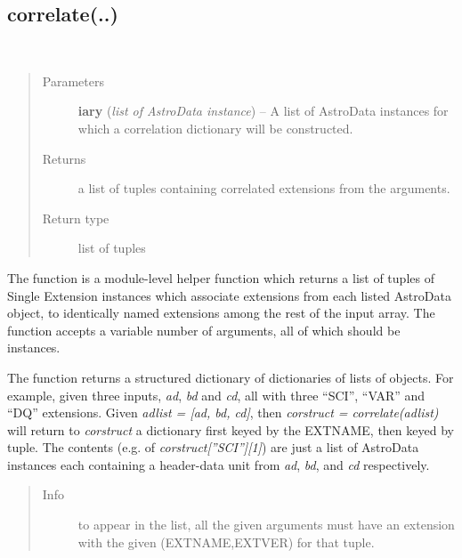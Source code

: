 \documentclass[letterpaper,10pt,english]{sphinxmanual}
\begin{document}
\subsection{correlate(..)}
\label{chapter_AstroDataClass:correlate}

\begin{fulllineitems}
\label{chapter_AstroDataClass:astrodata.data.correlate}~\begin{quote}\begin{description}
\item[{Parameters}] \leavevmode
\textbf{iary} (\emph{list of AstroData instance}) -- A list of AstroData instances for which a correlation dictionary
will be constructed.

\item[{Returns}] \leavevmode
a list of tuples containing correlated extensions from the arguments.

\item[{Return type}] \leavevmode
list of tuples

\end{description}\end{quote}

The  function is a module-level helper function which returns
a list of tuples of Single Extension  instances which associate
extensions from each listed AstroData object, to identically named
extensions among the rest of the input array. The  function
accepts a variable number of arguments, all of which should be 
instances.

The function returns a structured dictionary of dictionaries of lists of
 objects. For example, given three inputs, \emph{ad}, \emph{bd} and \emph{cd}, all
with three ``SCI'', ``VAR'' and ``DQ'' extensions. Given \emph{adlist = {[}ad, bd,
cd{]}}, then \emph{corstruct = correlate(adlist)} will return to \emph{corstruct} a
dictionary first keyed by the EXTNAME, then keyed by tuple. The contents
(e.g. of \emph{corstruct{[}''SCI''{]}{[}1{]}}) are just a list of AstroData instances each
containing a header-data unit from \emph{ad}, \emph{bd}, and \emph{cd} respectively.
\begin{quote}\begin{description}
\item[{Info }] \leavevmode
to appear in the list, all the given arguments must have an extension
with the given (EXTNAME,EXTVER) for that tuple.

\end{description}\end{quote}

\end{fulllineitems}
\end{document}
